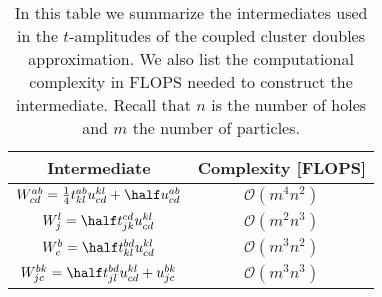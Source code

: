        \begin{table}
            \centering
            \caption{In this table we summarize the intermediates used in
            the $t$-amplitudes of the coupled cluster doubles approximation. We
            also list the computational complexity in FLOPS needed to construct
            the intermediate. Recall that $n$ is the number of holes and $m$ the
            number of particles.}
            \begin{tabular}{cc}
                Intermediate & Complexity [FLOPS] \\
                \midrule
                $W^{ab}_{cd}
                = \frac{1}{4} t^{ab}_{kl} u^{kl}_{cd}
                + \half u^{ab}_{cd}$
                &
                $\mathcal{O}(m^4 n^2)$ \\
                \addlinespace
                $W^{l}_{j}
                = \half t^{cd}_{jk} u^{kl}_{cd}$
                &
                $\mathcal{O}(m^2 n^3)$
                \\
                \addlinespace
                $W^{b}_{c}
                = \half t^{bd}_{kl} u^{kl}_{cd}$
                &
                $\mathcal{O}(m^3 n^2)$
                \\
                \addlinespace
                $W^{bk}_{jc}
                = \half t^{bd}_{jl} u^{kl}_{cd}
                + u^{bk}_{jc}$
                &
                $\mathcal{O}(m^3n^3)$
            \end{tabular}
            \label{tab:intermediates_ccd}
        \end{table}

